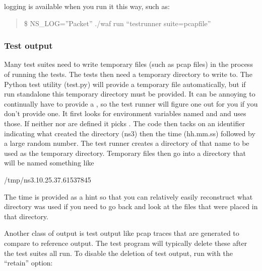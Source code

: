 \documentclass[letterpaper,10pt,english]{sphinxmanual}
\renewcommand{\sphinxcode}[1]{\texttt{\small{#1}}}
\begin{document}
 logging is available when you run it this way, such as:
\begin{quote}

\$ NS\_LOG=”Packet” ./waf \textendash{}run “test\sphinxhyphen{}runner \textendash{}suite=pcap\sphinxhyphen{}file”
\end{quote}


\subsubsection{Test output}
\label{\detokenize{test-framework:test-output}}
Many test suites need to write temporary files (such as pcap files)
in the process of running the tests.  The tests then need a temporary directory
to write to.  The Python test utility (test.py) will provide a temporary file
automatically, but if run stand\sphinxhyphen{}alone this temporary directory must be provided.
It can be annoying to continually have to provide
a \sphinxcode{\sphinxupquote{\sphinxhyphen{}\sphinxhyphen{}tempdir}}, so the test runner will figure one out for you if you don’t
provide one.  It first looks for environment variables named \sphinxcode{} and
\sphinxcode{} and uses those.  If neither \sphinxcode{} nor \sphinxcode{} are defined
it picks \sphinxcode{}.  The code then tacks on an identifier indicating what
created the directory (ns\sphinxhyphen{}3) then the time (hh.mm.ss) followed by a large random
number.  The test runner creates a directory of that name to be used as the
temporary directory.  Temporary files then go into a directory that will be
named something like

\begin{sphinxVerbatim}[commandchars=\\\{\}]
/tmp/ns\PYGZhy{}3.10.25.37.61537845
\end{sphinxVerbatim}

The time is provided as a hint so that you can relatively easily reconstruct
what directory was used if you need to go back and look at the files that were
placed in that directory.

Another class of output is test output like pcap traces that are generated
to compare to reference output.  The test program will typically delete
these after the test suites all run.  To disable the deletion of test
output, run \sphinxcode{} with the “retain” option:
\end{document}
